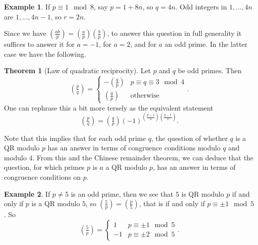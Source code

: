 \documentclass{article}
\newcommand{\rb}[1]{\left( #1 \right)}
\newcommand{\legendre}[2]{\rb{\tfrac{#1}{#2}}}
\theoremstyle{definition}\newtheorem{definition}{Definition}
\theoremstyle{definition}\newtheorem*{remark}{Remark}
\theoremstyle{definition}\newtheorem*{example}{Example}
\theoremstyle{definition}\newtheorem*{note}{Note}
\newtheorem{theorem}[definition]{Theorem}
\begin{document}
\begin{example}
If $ p \equiv 1 \mod 8 $, say $ p = 1 + 8n $, so $ q = 4n $. Odd integers in $ 1, \dots, 4n $ are $ 1, \dots, 4n - 1 $, so $ r = 2n $.
\end{example}

Since we have $ \legendre{ab}{p} = \legendre{a}{p}\legendre{b}{p} $, to answer this question in full generality it suffices to answer it for $ a = -1 $, for $ a = 2 $, and for $ a $ an odd prime. In the latter case we have the following.

\begin{theorem}[Law of quadratic reciprocity]
Let $ p $ and $ q $ be odd primes. Then
$$ \legendre{p}{q} = \begin{cases} -\legendre{q}{p} & p \equiv q \equiv 3 \mod 4 \\ \legendre{q}{p} & \text{otherwise} \end{cases}. $$
One can rephrase this a bit more tersely as the equivalent statement
$$ \legendre{p}{q} = \legendre{q}{p}\rb{-1}^{\rb{\tfrac{p - 1}{2}}\rb{\tfrac{q - 1}{2}}}. $$
\end{theorem}

Note that this implies that for each odd prime $ q $, the question of whether $ q $ is a QR modulo $ p $ has an answer in terms of congruence conditions modulo $ q $ and modulo $ 4 $. From this and the Chinese remainder theorem, we can deduce that the question, for which primes $ p $ is $ a $ a QR modulo $ p $, has an answer in terms of congruence conditions on $ p $.

\begin{example}
If $ p \ne 5 $ is an odd prime, then we see that $ 5 $ is QR modulo $ p $ if and only if $ p $ is a QR modulo $ 5 $, so $ \legendre{5}{p} = \legendre{p}{5} $, that is if and only if $ p \equiv \pm 1 \mod 5 $. So
$$ \legendre{5}{p} = \begin{cases} 1 & p \equiv \pm 1 \mod 5 \\ -1 & p \equiv \pm 2 \mod 5 \end{cases}. $$
\end{example}
\end{document}
